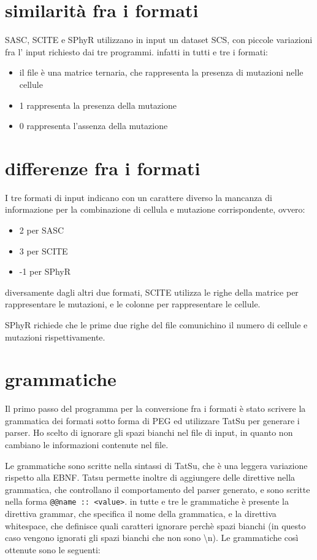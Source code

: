 \section{similarità fra i formati}
SASC, SCITE e SPhyR utilizzano in input un dataset SCS, con piccole variazioni fra l' input richiesto dai tre programmi. infatti in tutti e tre i formati:
\begin{itemize}
\item il file è una matrice ternaria, che rappresenta la presenza di mutazioni nelle cellule
\item 1 rappresenta la presenza della mutazione
\item 0 rappresenta l'assenza della mutazione
\end{itemize}

\section{differenze fra i formati}
I tre formati di input indicano con un carattere diverso la mancanza di informazione per la combinazione di cellula e mutazione corrispondente, ovvero:
\begin{itemize}
\item 2 per SASC
\item 3 per SCITE
\item -1 per SPhyR
\end{itemize}

diversamente dagli altri due formati, SCITE utilizza le righe della matrice per rappresentare le mutazioni, e le colonne per rappresentare le cellule.

SPhyR richiede che le prime due righe del file comunichino il numero di cellule e mutazioni rispettivamente.

\section{grammatiche}
Il primo passo del programma per la conversione fra i formati è stato scrivere la grammatica dei formati sotto forma di PEG ed utilizzare TatSu per generare i parser. Ho scelto di ignorare gli spazi bianchi nel file di input, in quanto non cambiano le informazioni contenute nel file. 

Le grammatiche sono scritte nella sintassi di TatSu, che è una leggera variazione rispetto alla EBNF. Tatsu permette inoltre di aggiungere delle direttive nella grammatica, che controllano il comportamento del parser generato, e sono scritte nella forma \verb|@@name :: <value>|. in tutte e tre le grammatiche è presente la direttiva grammar, che specifica il nome della grammatica, e la direttiva whitespace, che definisce quali caratteri ignorare perchè spazi bianchi (in questo caso vengono ignorati gli spazi bianchi che non sono \textbackslash n).
Le grammatiche così ottenute sono le seguenti:

